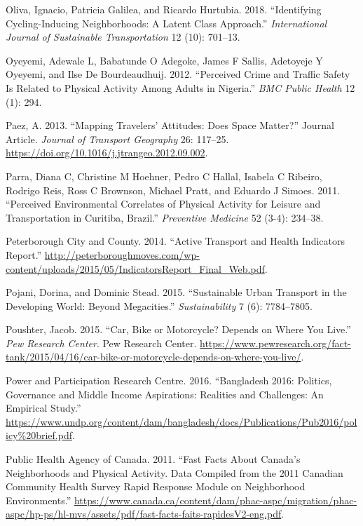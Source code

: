 \documentclass[]{elsarticle} %
\begin{document}
\leavevmode\hypertarget{ref-oliva2018identifying}{}%
Oliva, Ignacio, Patricia Galilea, and Ricardo Hurtubia. 2018.
``Identifying Cycling-Inducing Neighborhoods: A Latent Class Approach.''
\emph{International Journal of Sustainable Transportation} 12 (10):
701--13.

\leavevmode\hypertarget{ref-oyeyemi2012perceived}{}%
Oyeyemi, Adewale L, Babatunde O Adegoke, James F Sallis, Adetoyeje Y
Oyeyemi, and Ilse De Bourdeaudhuij. 2012. ``Perceived Crime and Traffic
Safety Is Related to Physical Activity Among Adults in Nigeria.''
\emph{BMC Public Health} 12 (1): 294.

\leavevmode\hypertarget{ref-Paez2013mapping}{}%
Paez, A. 2013. ``Mapping Travelers' Attitudes: Does Space Matter?''
Journal Article. \emph{Journal of Transport Geography} 26: 117--25.
\url{https://doi.org/10.1016/j.jtrangeo.2012.09.002}.

\leavevmode\hypertarget{ref-parra2011perceived}{}%
Parra, Diana C, Christine M Hoehner, Pedro C Hallal, Isabela C Ribeiro,
Rodrigo Reis, Ross C Brownson, Michael Pratt, and Eduardo J Simoes.
2011. ``Perceived Environmental Correlates of Physical Activity for
Leisure and Transportation in Curitiba, Brazil.'' \emph{Preventive
Medicine} 52 (3-4): 234--38.

\leavevmode\hypertarget{ref-peterborough2014at}{}%
Peterborough City and County. 2014. ``Active Transport and Health
Indicators Report.''
\url{http://peterboroughmoves.com/wp-content/uploads/2015/05/IndicatorsReport_Final_Web.pdf}.

\leavevmode\hypertarget{ref-pojani2015sustainable}{}%
Pojani, Dorina, and Dominic Stead. 2015. ``Sustainable Urban Transport
in the Developing World: Beyond Megacities.'' \emph{Sustainability} 7
(6): 7784--7805.

\leavevmode\hypertarget{ref-poushter_2015}{}%
Poushter, Jacob. 2015. ``Car, Bike or Motorcycle? Depends on Where You
Live.'' \emph{Pew Research Center}. Pew Research Center.
\url{https://www.pewresearch.org/fact-tank/2015/04/16/car-bike-or-motorcycle-depends-on-where-you-live/}.

\leavevmode\hypertarget{ref-power2016bd}{}%
Power and Participation Research Centre. 2016. ``Bangladesh 2016:
Politics, Governance and Middle Income Aspirations: Realities and
Challenges: An Empirical Study.''
\url{https://www.undp.org/content/dam/bangladesh/docs/Publications/Pub2016/policy\%20brief.pdf}.

\leavevmode\hypertarget{ref-public2011can}{}%
Public Health Agency of Canada. 2011. ``Fast Facts About Canada's
Neighborhoods and Physical Activity. Data Compiled from the 2011
Canadian Community Health Survey Rapid Response Module on Neighborhood
Environments.''
\url{https://www.canada.ca/content/dam/phac-aspc/migration/phac-aspc/hp-ps/hl-mvs/assets/pdf/fast-facts-faits-rapidesV2-eng.pdf}.
\end{document}
